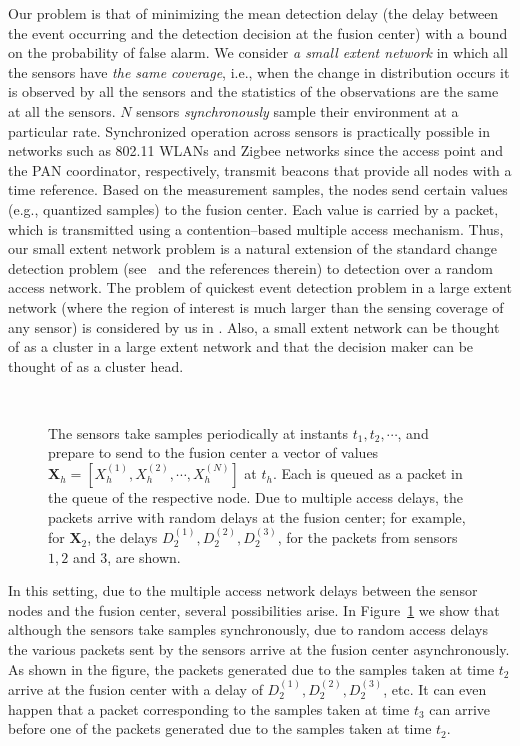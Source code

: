 \documentclass[acmtosn]{acmtrans2m}
\begin{document}
Our problem is that of minimizing the mean detection delay (the delay
between the event occurring and the detection decision at the fusion
center) with a bound on the probability of false alarm. We consider
\emph{a small extent network} in which all the sensors have {\em the
same coverage}, i.e., when the change in distribution occurs it is
observed by all the sensors and the statistics of the observations are
the same at all the sensors. $N$ sensors \emph{synchronously} sample
their environment at a particular rate. Synchronized operation across
sensors is practically possible in networks such as 802.11 WLANs and
Zigbee networks since the access point and the PAN coordinator,
respectively, transmit beacons that provide all nodes with a time
reference. Based on the measurement samples, the nodes send certain
values (e.g., quantized samples) to the fusion center. Each value is
carried by a packet, which is transmitted using a contention--based
multiple access mechanism. Thus, our small extent network problem is a
natural extension of the standard change detection problem
(see~\cite{veeravalli01decentralized-quickest} and the references
therein) to detection over a random access network. The problem of
quickest event detection problem in a large extent network (where the
region of interest is much larger than the sensing coverage of any
sensor) is considered by us in \cite{premkumar-etal09distributed-det}.
Also, a small extent network can be thought of as a cluster in a large
extent network and that the decision maker can be thought of as a
cluster head. 


\begin{figure}[t]
   \centering \
   \caption{The sensors take samples periodically at instants $t_1,
     t_2, \cdots$, and prepare to send to the fusion center a vector
     of values $\mathbf{X}_h = \left[X_h^{(1)}, X_h^{(2)}, \cdots, X_h^{(N)}\right]$ 
     at $t_h$. Each is queued as a packet in
     the queue of the respective node. Due to multiple access delays,
     the packets arrive with random delays at the fusion center; for
     example, for $\mathbf{X}_2$, the delays $D^{(1)}_2, D^{(2)}_2,
     D^{(3)}_2$, for the packets from sensors $1, 2$ and $3$, are
     shown. }
   \label{fig:samples_with_mac_delays}
\end{figure}

In this setting, due to the multiple access network delays between the
sensor nodes and the fusion center, several possibilities arise. In
Figure~\ref{fig:samples_with_mac_delays} we show that although the
sensors take samples synchronously, due to random access delays
the various packets sent by the sensors arrive at the fusion center
asynchronously. As shown in the figure, the packets generated due to
the samples taken at time $t_2$ arrive at the fusion center with a 
delay of $D^{(1)}_2, D^{(2)}_2, D^{(3)}_2$, etc. It can even happen 
that a packet corresponding to the samples taken at time $t_3$ can 
arrive before one of the packets generated due to the samples taken 
at time $t_2$. 
\end{document}
